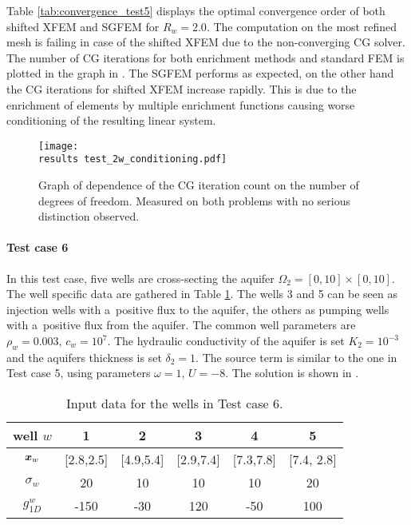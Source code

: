 Table \ref{tab:convergence_test5} displays the optimal convergence order of both shifted XFEM and SGFEM for $R_w=2.0$.
The computation on the most refined mesh is failing in case of the shifted XFEM due to the non-converging CG solver.
The number of CG iterations for both enrichment methods and standard FEM is plotted in the graph in .
The SGFEM performs as expected, on the other hand the CG iterations for shifted XFEM increase rapidly.
This is due to the enrichment of elements by multiple enrichment functions causing worse conditioning of the resulting linear system.
%
\begin{figure}[!htb]
  \centering    
    \texttt{[image: \\results test\_2w\_conditioning.pdf]}
  \caption[CG iterations count in Test case 3]{Graph of dependence of the CG iteration count on the 
  number of degrees of freedom. Measured on both problems with no serious distinction observed.}
  \label{fig:test_2w_conditioning}
\end{figure}



\paragraph{Test case 6}
In this test case, five wells are cross-secting the aquifer $\Omega_2 = [0,10]\times[0, 10]$.
The well specific data are gathered in Table \ref{tab:test_case6_wells_data}.
The wells 3 and 5 can be seen as injection wells with a~positive flux to the aquifer, the others as pumping wells with a~positive flux from the aquifer.
The common well parameters are $\rho_w = 0.003$, $c_w = 10^{7}$.
The hydraulic conductivity of the aquifer is set $K_2=10^{-3}$ and the aquifers thickness is set $\delta_2=1$.
The source term is similar to the one in Test case 5, using parameters $\omega=1$, $U=-8$.
The solution is shown in .
%
\begin{table}[!htb]
\begin{center}
\begin{tabular}{c|ccccc}
\toprule
well $w$ & 1 & 2 & 3 & 4 & 5 \\
\midrule
$\mathbf{\boldsymbol{x}}_w$     & [2.8,2.5]  & [4.9,5.4]  & [2.9,7.4]  & [7.3,7.8] & [7.4, 2.8] \\
$\sigma_w$  & 20   & 10  & 10  & 10  & 20 \\
$g^w_{1D}$  & -150 & -30 & 120 & -50 & 100 \\
\bottomrule
\end{tabular}
\caption{Input data for the wells in Test case 6.}
\label{tab:test_case6_wells_data}
\end{center}
\end{table}


